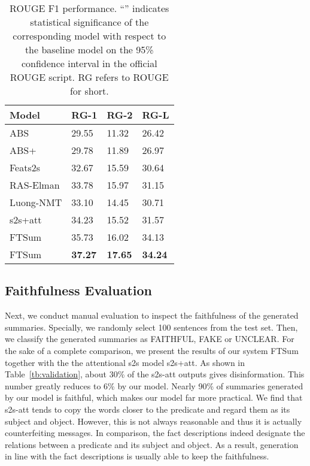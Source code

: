 \documentclass[letterpaper]{article} \usepackage{aaai18}  \usepackage{times}  \usepackage{helvet}  \usepackage{courier}  \usepackage{url}  \usepackage{graphicx}  \usepackage{amsfonts}
\begin{document}
	\begin{table}
		\centering
		\begin{tabular}{l|lll}
			\hline
			Model     & RG-1 & RG-2 & RG-L \\ \hline
			ABS       & 29.55  & 11.32  & 26.42  \\
			ABS+      & 29.78  & 11.89  & 26.97  \\
			Feats2s   & 32.67  & 15.59   & 30.64  \\
			RAS-Elman & 33.78  & 15.97   & 31.15  \\
			Luong-NMT & 33.10  & 14.45  & 30.71  \\
			s2s+att   & 34.23  & 15.52  & 31.57  \\ \hline
			FTSum     & 35.73   & 16.02   & 34.13   \\
			FTSum     & \textbf{37.27}   & \textbf{17.65}   & \textbf{34.24}   \\ \hline
		\end{tabular}
		\caption{ROUGE F1 performance. ``'' indicates statistical significance of the corresponding model with respect to the baseline model on the 95\% confidence interval in the official ROUGE script. RG refers to ROUGE for short.}
		\label{tb:rouge}
	\end{table}
	
	\subsection{Faithfulness Evaluation}
	Next, we conduct manual evaluation to inspect the faithfulness of the generated summaries.
	Specially, we randomly select 100 sentences from the test set.
	Then, we classify the generated summaries as FAITHFUL, FAKE or UNCLEAR.
	For the sake of a complete comparison, we present the results of our system FTSum together with the the attentional s2s model s2s+att.
	As shown in Table~\ref{tb:validation}, about 30\% of the s2s-att outputs gives disinformation.
	This number greatly reduces to 6\% by our model.
	Nearly 90\% of summaries generated by our model is faithful, which makes our model far more practical.
	We find that s2s-att tends to copy the words closer to the predicate and regard them as its subject and object.
	However, this is not always reasonable and thus it is actually counterfeiting messages. 
	In comparison, the fact descriptions indeed designate the relations between a predicate and its subject and object.
	As a result, generation in line with the fact descriptions is usually able to keep the faithfulness.
	
\end{document}
